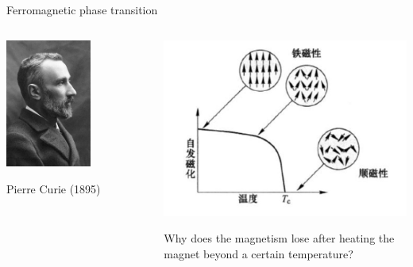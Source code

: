\begin{frame}{Ferromagnetic phase transition}
	\begin{columns}
		\begin{column}{0.5\textwidth}
			\centerline{\includegraphics[width = 0.6\textwidth]{Figures/pi.jpg}}
			\centerline{Pierre Curie (1895)}
		\end{column}
		
		\begin{column}{0.5\textwidth}
			\centerline{\includegraphics[width = 1.0\textwidth]{Figures/tr.jpg}}
			Why does the magnetism lose after heating the magnet beyond a certain temperature?
		\end{column}
	\end{columns}
	
\end{frame}

